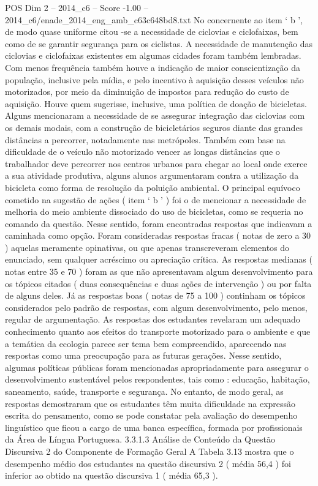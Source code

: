 \begin{textsample}{POS Dim 2 – 2014\_c6 – Score -1.00 – 2014\_c6/enade\_2014\_eng\_amb\_c63c648bd8.txt}
No concernente ao item ‘ b ’, de modo quase uniforme citou -se a necessidade de ciclovias e ciclofaixas, bem como de se garantir segurança para os ciclistas.
A necessidade de manutenção das ciclovias e ciclofaixas existentes em algumas cidades foram também lembradas.
Com menos frequência também houve a indicação de maior conscientização da população, inclusive pela mídia, e pelo incentivo à aquisição desses veículos não motorizados, por meio da diminuição de impostos para redução do custo de aquisição.
Houve quem sugerisse, inclusive, uma política de doação de bicicletas.
Alguns mencionaram a necessidade de se assegurar integração das ciclovias com os demais modais, com a construção de bicicletários seguros diante das grandes distâncias a percorrer, notadamente nas metrópoles.
Também com base na dificuldade de o veículo não motorizado vencer as longas distâncias que o trabalhador deve percorrer nos centros urbanos para chegar ao local onde exerce a sua atividade produtiva, alguns alunos argumentaram contra a utilização da bicicleta como forma de resolução da poluição ambiental.
O principal equívoco cometido na sugestão de ações ( item ‘ b ’ ) foi o de mencionar a necessidade de melhoria do meio ambiente dissociado do uso de bicicletas, como se requeria no comando da questão.
Nesse sentido, foram encontradas respostas que indicavam a caminhada como opção.
Foram consideradas respostas fracas ( notas de zero a 30 ) aquelas meramente opinativas, ou que apenas transcreveram elementos do enunciado, sem qualquer acréscimo ou apreciação crítica.
As respostas medianas ( notas entre 35 e 70 ) foram as que não apresentavam algum desenvolvimento para os tópicos citados ( duas consequências e duas ações de intervenção ) ou por falta de alguns deles.
Já as respostas boas ( notas de 75 a 100 ) continham os tópicos considerados pelo padrão de respostas, com algum desenvolvimento, pelo menos, regular de argumentação.
As respostas dos estudantes revelaram um adequado conhecimento quanto aos efeitos do transporte motorizado para o ambiente e que a temática da ecologia parece ser tema bem compreendido, aparecendo nas respostas como uma preocupação para as futuras gerações.
Nesse sentido, algumas políticas públicas foram mencionadas apropriadamente para assegurar o desenvolvimento sustentável pelos respondentes, tais como : educação, habitação, saneamento, saúde, transporte e segurança.
No entanto, de modo geral, as respostas demostraram que os estudantes têm muita dificuldade na expressão escrita do pensamento, como se pode constatar pela avaliação do desempenho linguístico que ficou a cargo de uma banca específica, formada por profissionais da Área de Língua Portuguesa. 3.3.1.3 Análise de Conteúdo da Questão Discursiva 2 do Componente de Formação Geral A Tabela 3.13 mostra que o desempenho médio dos estudantes na questão discursiva 2 ( média 56,4 ) foi inferior ao obtido na questão discursiva 1 ( média 65,3 ).

\end{textsample}
